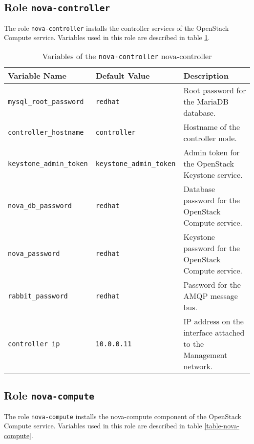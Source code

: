 \subsection{Role \texttt{nova-controller}}

The role \texttt{nova-controller} installs the controller services of the OpenStack Compute service. Variables used in this role are described in table \ref{table-nova-controller}.

\begin{table}[!h]
  \centering
  \begin{tabular}{|l|l|p{5cm}|}\hline
    Variable Name & Default Value & Description \\\hline

    \texttt{mysql\_root\_password} & \texttt{redhat} & Root password for the MariaDB database. \\\hline

    \texttt{controller\_hostname} & \texttt{controller} & Hostname of the controller node. \\\hline

    \texttt{keystone\_admin\_token} & \texttt{keystone\_admin\_token} & Admin token for the OpenStack Keystone service. \\\hline

    \texttt{nova\_db\_password} & \texttt{redhat} & Database password for the OpenStack Compute service. \\\hline
    \texttt{nova\_password} & \texttt{redhat} & Keystone password for the OpenStack Compute service. \\\hline
    \texttt{rabbit\_password} & \texttt{redhat} & Password for the AMQP message bus. \\\hline
    \texttt{controller\_ip} & \texttt{10.0.0.11} & IP address on the interface attached to the Management network. \\\hline
  \end{tabular}
\caption{Variables of the \texttt{nova-controller} nova-controller}
\label{table-nova-controller}
\end{table}


\subsection{Role \texttt{nova-compute}}

The role \texttt{nova-compute} installs the nova-compute component of the OpenStack Compute service. Variables used in this role are described in table \ref{table-nova-compute}.

